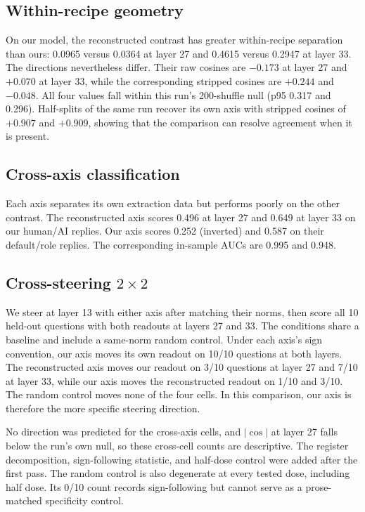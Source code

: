 \subsection{Within-recipe geometry}

On our model, the reconstructed contrast has greater within-recipe separation
than ours: 0.0965 versus 0.0364 at layer 27 and 0.4615 versus 0.2947 at layer
33. The directions nevertheless differ. Their raw cosines are $-0.173$ at
layer 27 and $+0.070$ at layer 33, while the corresponding stripped cosines
are $+0.244$ and $-0.048$. All four values fall within this run's 200-shuffle
null (p95 0.317 and 0.296). Half-splits of the same run recover its own axis
with stripped cosines of $+0.907$ and $+0.909$, showing that the comparison can
resolve agreement when it is present.

\subsection{Cross-axis classification}

Each axis separates its own extraction data but performs poorly on the other
contrast. The reconstructed axis scores 0.496 at layer 27 and 0.649 at layer 33
on our human/AI replies. Our axis scores 0.252 (inverted) and 0.587 on their
default/role replies. The corresponding in-sample AUCs are 0.995 and 0.948.

\subsection{Cross-steering \texorpdfstring{$2\times2$}{2x2}}

We steer at layer 13 with either axis after matching their norms, then score all
10 held-out questions with both readouts at layers 27 and 33. The conditions
share a baseline and include a same-norm random control. Under each axis's sign
convention, our axis moves its own readout on 10/10 questions at both layers.
The reconstructed axis moves our readout on 3/10 questions at layer 27 and 7/10
at layer 33, while our axis moves the reconstructed readout on 1/10 and 3/10.
The random control moves none of the four cells. In this comparison, our axis
is therefore the more specific steering direction.

No direction was predicted for the cross-axis cells, and $|\cos|$ at layer 27
falls below the run's own null, so these cross-cell counts are descriptive. The
register decomposition, sign-following statistic, and half-dose control were
added after the first pass. The random control is also degenerate at every
tested dose, including half dose. Its 0/10 count records sign-following but
cannot serve as a prose-matched specificity control.

